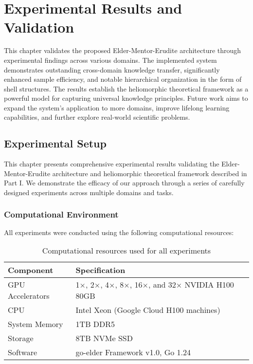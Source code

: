 \chapter{Experimental Results and Validation}

\begin{tcolorbox}[colback=PureBlue!5!white,colframe=PureBlue!75!black,title=Chapter Summary]
This chapter validates the proposed Elder-Mentor-Erudite architecture through experimental findings across various domains. The implemented system demonstrates outstanding cross-domain knowledge transfer, significantly enhanced sample efficiency, and notable hierarchical organization in the form of shell structures. The results establish the heliomorphic theoretical framework as a powerful model for capturing universal knowledge principles. Future work aims to expand the system's application to more domains, improve lifelong learning capabilities, and further explore real-world scientific problems.
\end{tcolorbox}

\section{Experimental Setup}

This chapter presents comprehensive experimental results validating the Elder-Mentor-Erudite architecture and heliomorphic theoretical framework described in Part I. We demonstrate the efficacy of our approach through a series of carefully designed experiments across multiple domains and tasks.

\subsection{Computational Environment}

All experiments were conducted using the following computational resources:

\begin{table}[h]
\centering
\begin{tabular}{|l|l|}
\hline
\textbf{Component} & \textbf{Specification} \\
\hline
GPU Accelerators & 1×, 2×, 4×, 8×, 16×, and 32× NVIDIA H100 80GB \\
\hline
CPU & Intel Xeon (Google Cloud H100 machines) \\
\hline
System Memory & 1TB DDR5 \\
\hline
Storage & 8TB NVMe SSD \\
\hline
Software & go-elder Framework v1.0, Go 1.24 \\
\hline
\end{tabular}
\caption{Computational resources used for all experiments}
\label{tab:computational_resources}
\end{table}

